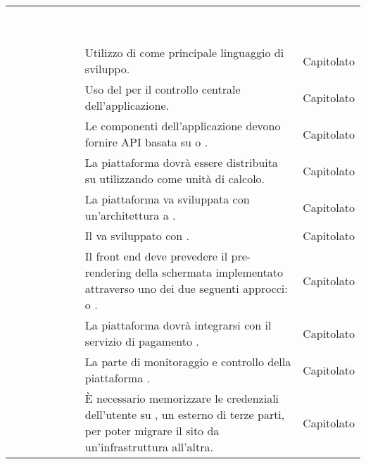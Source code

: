 \renewcommand{\arraystretch}{1.5}


\begin{longtable}{c C{9.5cm} C{2.5cm}} 
	
	\textcolor{white}{\textbf{Codice Requisito}}&
	\textcolor{white}{\textbf{Descrizione}}&
	\textcolor{white}{\textbf{Fonte}}\\

	 & Utilizzo di  come principale linguaggio di sviluppo. & Capitolato \\
	
	 & Uso del   per il controllo centrale dell'applicazione. & Capitolato \\
	
	 & Le componenti dell'applicazione devono fornire API basata su  o . & Capitolato \\
	
	 & La piattaforma dovrà essere distribuita su  utilizzando  come unità di calcolo. & Capitolato \\
	
	 & La piattaforma va sviluppata con un'architettura a . & Capitolato \\
	
	 & Il  va sviluppato con . & Capitolato \\
	
	 & Il front end deve prevedere il pre-rendering della schermata  implementato attraverso uno dei due seguenti approcci:  o . & Capitolato \\
	
	 & La piattaforma dovrà integrarsi con il servizio di pagamento . & Capitolato \\
	
	 & La parte di monitoraggio e controllo della piattaforma . & Capitolato \\
	
	 & È necessario memorizzare le credenziali dell'utente su , un  esterno di terze parti, per poter migrare il sito da un'infrastruttura all'altra. & Capitolato \\
	

\end{longtable}
